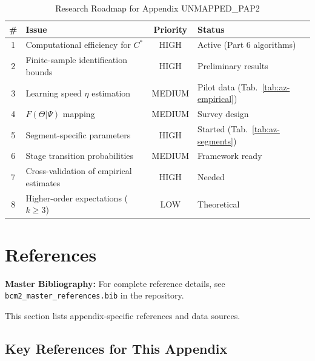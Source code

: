 \begin{table}[htbp]
\centering
\caption{Research Roadmap for Appendix UNMAPPED_PAP2}
\label{tab:az-roadmap}
\renewcommand{\arraystretch}{1.3}
\begin{tabular}{@{}clcl@{}}
\toprule
\textbf{\#} & \textbf{Issue} & \textbf{Priority} & \textbf{Status} \\
\midrule
1 & Computational efficiency for $C^*$ & HIGH & Active (Part 6 algorithms) \\
2 & Finite-sample identification bounds & HIGH & Preliminary results \\
3 & Learning speed $\eta$ estimation & MEDIUM & Pilot data (Tab.~\ref{tab:az-empirical}) \\
4 & $F(\Theta|\Psi)$ mapping & MEDIUM & Survey design \\
5 & Segment-specific parameters & HIGH & Started (Tab.~\ref{tab:az-segments}) \\
6 & Stage transition probabilities & MEDIUM & Framework ready \\
7 & Cross-validation of empirical estimates & HIGH & Needed \\
8 & Higher-order expectations ($k \geq 3$) & LOW & Theoretical \\
\bottomrule
\end{tabular}
\end{table}


\section{References}

\nocite{bcm_master}

\label{sec:az-references}

\begin{tcolorbox}[colback=blue!5!white, colframe=blue!75!black]
\textbf{Master Bibliography:} For complete reference details, see
\texttt{bcm2\_master\_references.bib} in the repository.

This section lists appendix-specific references and data sources.
\end{tcolorbox}

\vspace{0.5em}

\subsection{Key References for This Appendix}

